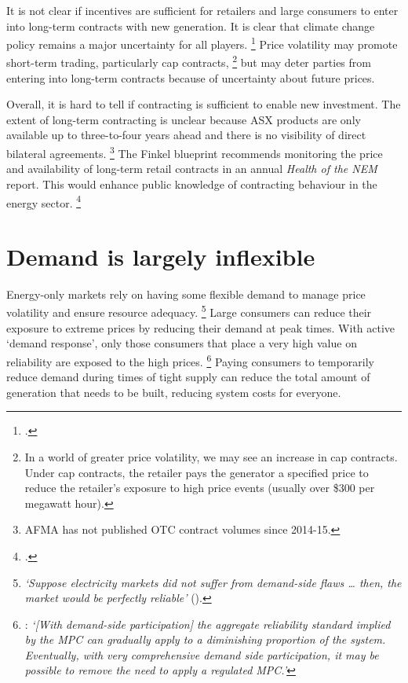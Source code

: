 \documentclass[FrontPage]{grattan}
\begin{document}
It is not clear if incentives are sufficient for retailers and large consumers to enter into long-term contracts with new generation. It is clear that climate change policy remains a major uncertainty for all players.%
\footcite{Simshauser2017IntermittentGeneration}
Price volatility may promote short-term trading, particularly cap contracts,%
\footnote{In a world of greater price volatility, we may see an increase in cap contracts. Under cap contracts, the retailer pays the generator a specified price to reduce the retailer's exposure to high price events (usually over \$300 per megawatt hour).}
but may deter parties from entering into long-term contracts because of uncertainty about future prices.

Overall, it is hard to tell if contracting is sufficient to enable new investment. The extent of long-term contracting is unclear because ASX products are only available up to three-to-four years ahead and there is no visibility of direct bilateral agreements.%
\footnote{AFMA has not published OTC contract volumes since 2014-15.}
The Finkel blueprint recommends monitoring the price and availability of long-term retail contracts in an annual \emph{Health of the NEM} report. This would enhance public knowledge of contracting behaviour in the energy sector.%
\footcite[][140--141]{Finkel2017ReviewFinal}

\section{Demand is largely inflexible}\label{sec:inflexible-demand}

Energy-only markets rely on having some flexible demand to manage price volatility and ensure resource adequacy.%
\footnote{\emph{`Suppose electricity markets did not suffer from demand-side flaws \dots{} then, the market would be perfectly reliable'} (\textcite{Cramton2013CapacityMarketFundamentals}).}
Large consumers can reduce their exposure to extreme prices by reducing their demand at peak times. With active `demand response', only those consumers that place a very high value on reliability are exposed to the high prices.%
\footnote{\textcite{Riesz2013CapacityMarket}: \emph{`[With demand-side participation] the aggregate reliability standard implied by the MPC can gradually apply to a diminishing proportion of the system. Eventually, with very comprehensive demand side participation, it may be possible to remove the need to apply a regulated MPC.'}}
Paying consumers to temporarily reduce demand during times of tight supply can reduce the total amount of generation that needs to be built, reducing system costs for everyone.
\end{document}
